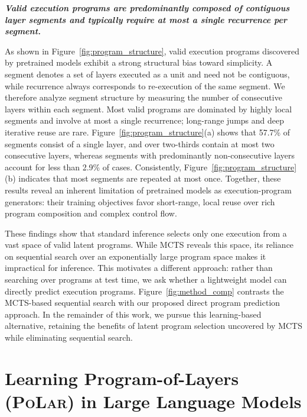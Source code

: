 \documentclass{article}
\theoremstyle{plain}
\theoremstyle{definition}
\theoremstyle{remark}
\newcommand\ours{\textsc{PoLar}\xspace}
\begin{document}
\begin{findingbox}[title={Finding 4}]
\textit{\textbf{Valid execution programs are predominantly composed of contiguous layer segments and typically require at most a single recurrence per segment.}}
\end{findingbox}
As shown in Figure~\ref{fig:program_structure}, valid execution programs discovered by pretrained models exhibit a strong structural bias toward simplicity.
A segment denotes a set of layers executed as a unit and need not be contiguous, while recurrence always corresponds to re-execution of the same segment.
We therefore analyze segment structure by measuring the number of consecutive layers within each segment.
Most valid programs are dominated by highly local segments and involve at most a single recurrence; long-range jumps and deep iterative reuse are rare.
Figure~\ref{fig:program_structure}(a) shows that 57.7\% of segments consist of a single layer, and over two-thirds contain at most two consecutive layers, whereas segments with predominantly non-consecutive layers account for less than 2.9\% of cases.
Consistently, Figure~\ref{fig:program_structure}(b) indicates that most segments are repeated at most once.
Together, these results reveal an inherent limitation of pretrained models as execution-program generators: their training objectives favor short-range, local reuse over rich program composition and complex control flow.





These findings show that standard inference selects only one execution from a vast space of valid latent programs.
While MCTS reveals this space, its reliance on sequential search over an exponentially large program space makes it impractical for inference.
This motivates a different approach: rather than searching over programs at test time, we ask whether a lightweight model can directly predict execution programs.
Figure~\ref{fig:method_comp} contrasts the MCTS-based sequential search with our proposed direct program prediction approach.
In the remainder of this work, we pursue this learning-based alternative, retaining the benefits of latent program selection uncovered by MCTS while eliminating sequential search.




\section{Learning Program-of-Layers (\ours) in Large Language Models}
\label{sec:method}
\end{document}
